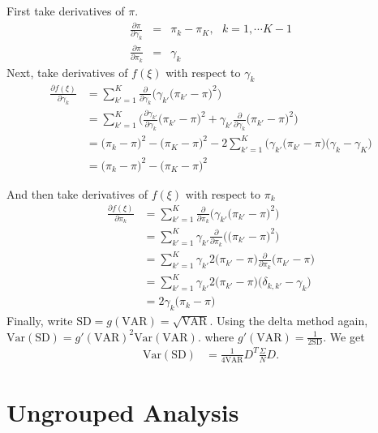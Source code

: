 \documentclass[11pt]{article}
\begin{document}
First take derivatives of $\pi$.
\begin{eqnarray}
\frac{ \partial \pi }{ \partial \gamma_k } & = & \pi_{k} - \pi_{K},
\mbox{ } k
= 1, \cdots K-1\\
\frac{ \partial \pi }{ \partial \pi_k} & = & \gamma_k
\end{eqnarray}
Next, take derivatives of $f(\xi)$ with respect to $\gamma_k$
\begin{align}
\frac{ \partial f(\xi) }{ \partial \gamma_k} & = 
\sum_{k'=1}^K \frac{ \partial }{ \partial \gamma_k} \bigg(
\gamma_{k'} \big( \pi_{k'} - \pi\big)^2
\bigg)\\
& =  \sum_{k'=1}^K \bigg(
\frac{ \partial \gamma_{k'} }{ \partial \gamma_k} 
\big( \pi_{k'} - \pi\big)^2
+
\gamma_{k'} \frac{ \partial }{ \partial \gamma_k} \big( \pi_{k'} - \pi\big)^2
\bigg)\\
& = 
\big( \pi_{k} - \pi \big)^2 -\big( \pi_{K} - \pi \big)^2
- 2 \sum_{k'=1}^K \bigg(\gamma_{k'} \big( \pi_{k'} - \pi\big)
\big(\gamma_k-\gamma_K\big)\\
& =  \big( \pi_{k} - \pi \big)^2 -\big( \pi_{K} - \pi \big)^2
\end{align}

And then take derivatives of $f(\xi)$ with respect to $\pi_k$ 
\begin{align}
\frac{ \partial f(\xi)}{ \partial \pi_k} & =  
\sum_{k'=1}^K \frac{ \partial }{ \partial \pi_k} \bigg(
\gamma_{k'} \big( \pi_{k'} - \pi\big)^2
\bigg)\\
 & = 
\sum_{k'=1}^K 
\gamma_{k'} \frac{ \partial }{ \partial \pi_k} \bigg(
\big( \pi_{k'} - \pi\big)^2
\bigg)\\
& = 
\sum_{k'=1}^K 
\gamma_{k'} 
2 \big( \pi_{k'} - \pi\big)
\frac{ \partial }{ \partial \pi_k} 
\big( \pi_{k'} - \pi\big)\\
 & =  
\sum_{k'=1}^K 
\gamma_{k'} 
2 \big( \pi_{k'} - \pi\big)
\bigg( \delta_{k,k'} - \gamma_k
\bigg)\\
& =  2 \gamma_{k}  \big( \pi_{k} - \pi\big)
\end{align}
Finally, write $\mbox{SD} = g(\mbox{VAR}) = \sqrt{\mbox{VAR}}$.  Using
the delta method again, 
$\mbox{Var}(\mbox{SD}) = g'(\mbox{VAR})^2 \mbox{Var}(\mbox{VAR})$.
where $g'(\mbox{VAR}) = \frac{1}{2 \mbox{SD}}$.
We get 
\begin{align}
\mbox{Var}(\mbox{SD}) & = \frac{1}{4 \mbox{VAR}}  D^T \frac{\Sigma}{N} D.
\end{align}


\section{Ungrouped Analysis}
\end{document}
